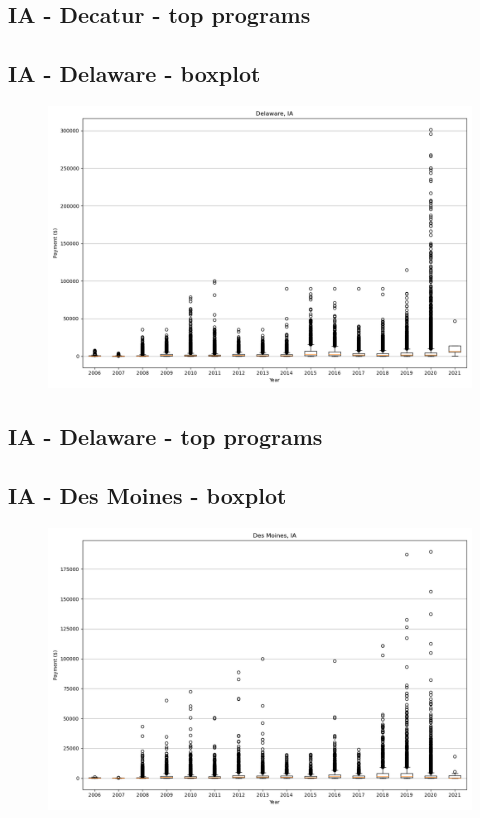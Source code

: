 \subsection*{IA - Decatur - top programs}

\newpage
\subsection*{IA - Delaware - boxplot}
\begin{figure}[h]
\centering
\includegraphics[width=7in]{../output/boxplots/counties/Delaware-IA_boxplot.png}
\end{figure}


\subsection*{IA - Delaware - top programs}

\newpage
\subsection*{IA - Des Moines - boxplot}
\begin{figure}[h]
\centering
\includegraphics[width=7in]{../output/boxplots/counties/Des Moines-IA_boxplot.png}
\end{figure}


